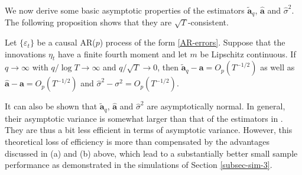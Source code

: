 We now derive some basic asymptotic properties of the estimators $\widetilde{\boldsymbol{a}}_q$, $\widehat{\boldsymbol{a}}$ and $\widehat{\sigma}^2$. The following proposition shows that they are $\sqrt{T}$-consistent. 
\begin{prop}\label{prop-lrv}
Let $\{\varepsilon_t\}$ be a causal AR($p$) process of the form \eqref{AR-errors}. Suppose that the innovations $\eta_t$ have a finite fourth moment and let $m$ be Lipschitz continuous. If $q \rightarrow \infty$ with $q/\log T \rightarrow \infty$ and $q/\sqrt{T} \rightarrow 0$, then $\widetilde{\boldsymbol{a}}_q - \boldsymbol{a} = O_p(T^{-1/2})$ as well as $\widehat{\boldsymbol{a}} - \boldsymbol{a} = O_p(T^{-1/2})$ and $\widehat{\sigma}^2 - \sigma^2 = O_p(T^{-1/2})$.
\end{prop}
It can also be shown that $\widetilde{\boldsymbol{a}}_q$, $\widehat{\boldsymbol{a}}$ and $\widehat{\sigma}^2$ are asymptotically normal. In general, their asymptotic variance is somewhat larger than that of the estimators in \cite{Hall2003}. They are thus a bit less efficient in terms of asymptotic variance. However, this theoretical loss of efficiency is more than compensated by the advantages discussed in (a) and (b) above, which lead to a substantially better small sample performance as demonstrated in the simulations of Section \ref{subsec-sim-3}. 


